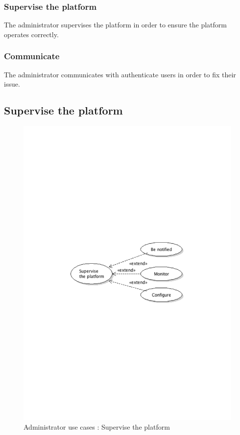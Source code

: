 		\subsubsection{Supervise the platform}
			The administrator supervises the platform in order to ensure the platform operates correctly.
		\subsubsection{Communicate}
			The administrator communicates with authenticate users in order to fix their issue.
	\subsection{Supervise the platform}
		\begin{figure}[ht]
			\begin{center}
				\includegraphics[width=\textwidth, trim=2cm 12cm 2cm 12cm]{UML_figure/use_cases/administrator/UC_Administrator_Supervise.pdf}
				\caption{Administrator use cases : Supervise the platform}
			\end{center}
		\end{figure}

